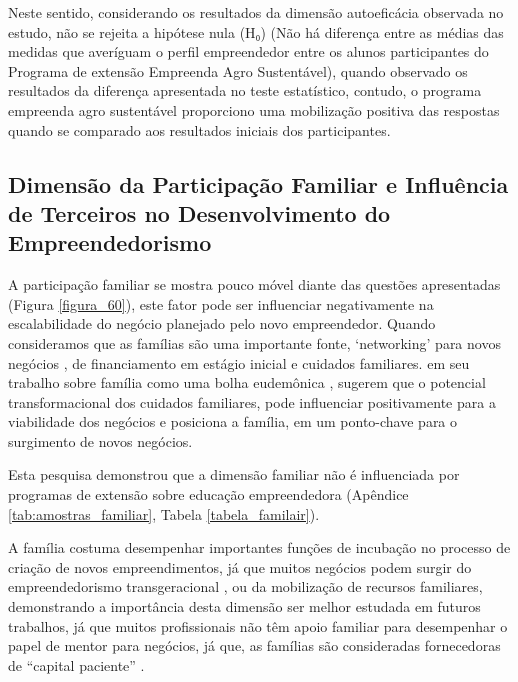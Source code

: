 Neste sentido, considerando os resultados da dimensão autoeficácia observada no estudo, não se rejeita a hipótese nula (H₀) (Não há diferença entre as médias das medidas que averíguam o perfil empreendedor entre os alunos participantes do Programa de extensão Empreenda Agro Sustentável), quando observado os resultados da diferença apresentada no teste estatístico, contudo, o programa empreenda agro sustentável proporciono uma mobilização positiva das respostas quando se comparado aos resultados iniciais dos participantes.


\subsection{Dimensão da Participação Familiar e Influência de Terceiros no Desenvolvimento do Empreendedorismo}

A participação familiar se mostra pouco móvel diante das questões apresentadas (Figura \ref{figura_60}), este fator pode ser influenciar negativamente na escalabilidade do negócio planejado pelo novo empreendedor. Quando consideramos que as famílias são uma importante fonte, ‘networking’ para novos negócios \cite{soto_does_2019,raza_influence_2019,kupp_when_2019}, de financiamento em estágio inicial \cite{soto_does_2019,edelman_impact_2016} e cuidados familiares.  em seu trabalho sobre família como uma bolha eudemônica \cite{puzi_transgenerational_2020}, sugerem que o potencial transformacional dos cuidados familiares, pode influenciar positivamente para a viabilidade dos negócios e posiciona a família, em um ponto-chave para o surgimento de novos negócios.

Esta pesquisa demonstrou que a dimensão familiar não é influenciada por programas de extensão sobre educação empreendedora (Apêndice \ref{tab:amostras_familiar}, Tabela \ref{tabela_familair}).

A família costuma desempenhar importantes funções de incubação no processo de criação de novos empreendimentos, já que muitos negócios podem surgir do empreendedorismo transgeracional \cite{puzi_transgenerational_2020,meliou_family_2020}, ou da mobilização de recursos familiares, demonstrando a importância desta dimensão ser melhor estudada em futuros trabalhos, já que muitos profissionais não têm apoio familiar para desempenhar o papel de mentor para negócios, já que, as famílias são consideradas fornecedoras de “capital paciente” \cite{lumpkin_longterm_2011}.





